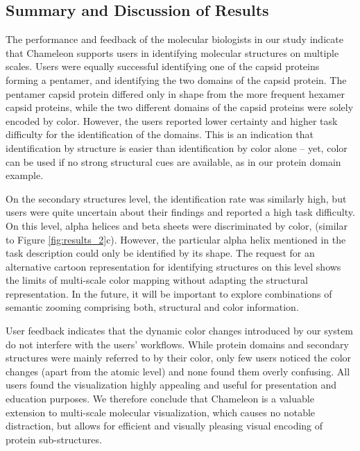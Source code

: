\documentclass{egpubl}
\begin{document}
\subsection{Summary and Discussion of Results}

The performance and feedback of the molecular biologists in our study indicate that Chameleon supports users in identifying molecular structures on multiple scales. 
Users were equally successful identifying one of the capsid proteins forming a pentamer, and identifying the two domains of the capsid protein. 
The pentamer capsid protein differed only in shape from the more frequent hexamer capsid proteins, while the two different domains of the capsid proteins were solely encoded by color. 
However, the users reported lower certainty and higher task difficulty for the identification of the domains.
This is an indication that identification by structure is easier than identification by color alone -- yet, color can be used if no strong structural cues are available, as in our protein domain example. 

On the secondary structures level, the identification rate was similarly high, but users were quite uncertain about their findings and reported a high task difficulty. 
On this level, alpha helices and beta sheets were discriminated by color, (similar to Figure \ref{fig:results_2}c). 
However, the particular alpha helix mentioned in the task description could only be identified by its shape. 
The request for an alternative cartoon representation for identifying structures on this level shows the limits of multi-scale color mapping without adapting the structural representation. 
In the future, it will be important to explore combinations of semantic zooming comprising both, structural and color information. 

User feedback indicates that the dynamic color changes introduced by our system do not interfere with the users' workflows. 
While protein domains and secondary structures were mainly referred to by their color, only few users noticed the color changes (apart from the atomic level) and none found them overly confusing. 
All users found the visualization highly appealing and useful for presentation and education purposes. 
We therefore conclude that Chameleon is a valuable extension to multi-scale molecular visualization, which causes no notable distraction, but allows for efficient and visually pleasing visual encoding of protein sub-structures. 
\end{document}
